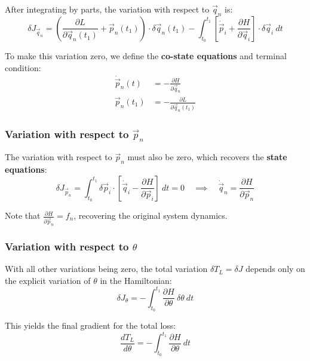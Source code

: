 After integrating by parts, the variation with respect to $\vec{q}_n$ is:
\begin{equation}
    \delta J_{\vec{q}_n} = \left(\frac{\partial L}{\partial \vec{q}_n(t_1)} + \vec{p}_n(t_1)\right) \cdot \delta \vec{q}_n(t_1)
    - \int_{t_0}^{t_1} \left[
    \dot{\vec{p}}_i + \frac{\partial H}{\partial \vec{q}_i}
    \right] \cdot \delta \vec{q}_i\ dt
\end{equation}

To make this variation zero, we define the \textbf{co-state equations} and terminal condition:
\begin{align}
    \dot{\vec{p}}_n(t) &= - \frac{\partial H}{\partial \vec{q}_n} \label{eq:costate_eq}\\
    \vec{p}_n(t_1) &= - \frac{\partial L}{\partial \vec{q}_n(t_1)} \label{eq:costate_bvp}
\end{align}

\subsubsection{Variation with respect to $\vec{p}_n$}

The variation with respect to $\vec{p}_n$ must also be zero, which recovers the \textbf{state equations}:
\begin{equation}
    \delta J_{\vec{p}_n} =
    \int_{t_0}^{t_1} \delta \vec{p}_i \cdot \left[
    \dot{\vec{q}}_i - \frac{\partial H}{\partial \vec{p}_i}
    \right]\ dt = 0 \quad \implies \quad \dot{\vec{q}}_n = \frac{\partial H}{\partial \vec{p}_n} \label{eq:state_eq}
\end{equation}

Note that $\frac{\partial H}{\partial \vec{p}_n} = f_n$, recovering the original system dynamics.

\subsubsection{Variation with respect to $\theta$}

With all other variations being zero, the total variation $\delta T_L = \delta J$ 
depends only on the explicit variation of $\theta$ in the Hamiltonian:
\begin{equation}
    \delta J_{\theta} = - \int_{t_0}^{t_1}
    \frac{\partial H}{\partial \theta}\ \delta \theta \ dt
\end{equation}

This yields the final gradient for the total loss:
\begin{equation}
    \frac{d T_L}{d\theta} = - \int_{t_0}^{t_1}
    \frac{\partial H}{\partial \theta}\ dt
    \label{eq:hamiltonian_grad}
\end{equation}